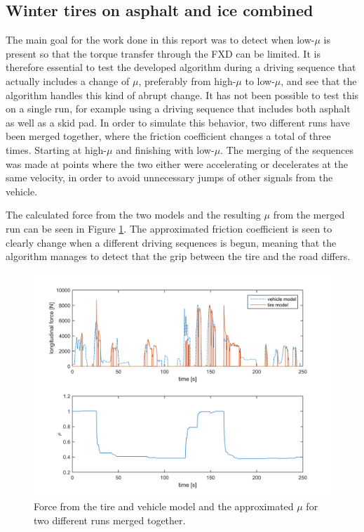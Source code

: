 \subsection{Winter tires on asphalt and ice combined}
The main goal for the work done in this report was to detect when low-$ \mu $ is present so that the torque transfer through the FXD can be limited. It is therefore essential to test the developed algorithm during a driving sequence that actually includes a change of $ \mu $, preferably from high-$ \mu $ to low-$ \mu $, and see that the algorithm handles this kind of abrupt change. It has not been possible to test this on a single run, for example using a driving sequence that includes both asphalt as well as a skid pad. In order to simulate this behavior, two different runs have been merged together, where the friction coefficient changes a total of three times. Starting at high-$ \mu $ and finishing with low-$ \mu $. The merging of the sequences was made at points where the two either were accelerating or decelerates at the same velocity, in order to avoid unnecessary jumps of other signals from the vehicle. 

The calculated force from the two models and the resulting $ \mu $ from the merged run can be seen in Figure \ref{force_mue_comb2}. The approximated friction coefficient is seen to clearly change when a different driving sequences is begun, meaning that the algorithm manages to detect that the grip between the tire and the road differs.
 
\begin{figure}[h]
	\centering
	\includegraphics[width=1.0\textwidth]{Pictures/force_mue_comb2}
	\caption {Force from the tire and vehicle model and the approximated $ \mu $ for two different runs merged together.}
	\label{force_mue_comb2}
\end{figure}

